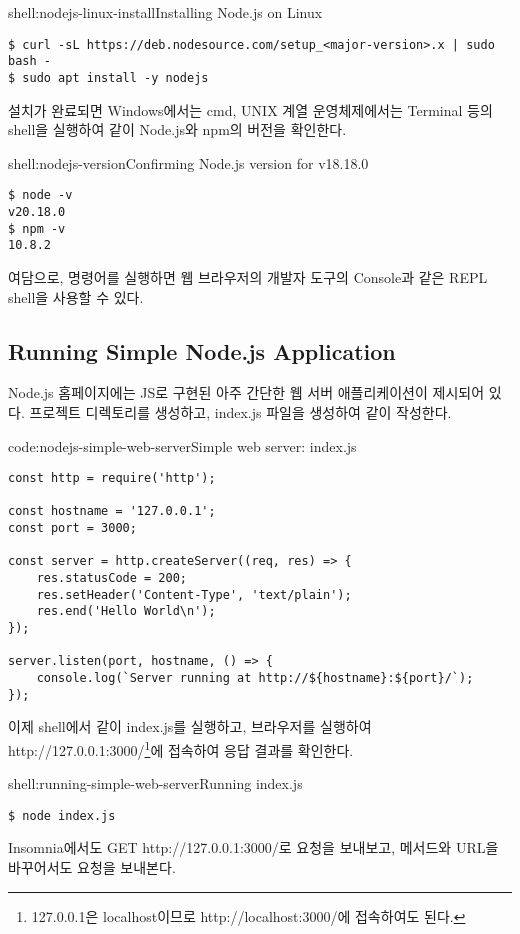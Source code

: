 
\begin{shell}{shell:nodejs-linux-install}{Installing Node.js on Linux}
\begin{verbatim}
$ curl -sL https://deb.nodesource.com/setup_<major-version>.x | sudo bash -
$ sudo apt install -y nodejs
\end{verbatim}
\end{shell}

설치가 완료되면 Windows에서는 cmd, UNIX 계열 운영체제에서는 Terminal 등의 shell을 실행하여 \과 같이 Node.js와 npm의 버전을 확인한다.
\clearpage

\begin{shell}{shell:nodejs-version}{Confirming Node.js version for v18.18.0}
\begin{verbatim}
$ node -v
v20.18.0
$ npm -v
10.8.2
\end{verbatim}
\end{shell}

여담으로,  명령어를 실행하면 웹 브라우저의 개발자 도구의 Console과 같은 REPL shell을 사용할 수 있다.

\subsection*{Running Simple Node.js Application}

Node.js 홈페이지에는 JS로 구현된 아주 간단한 웹 서버 애플리케이션이 제시되어 있다. 프로젝트 디렉토리를 생성하고, index.js 파일을 생성하여 \와 같이 작성한다.

\begin{code}{code:nodejs-simple-web-server}{Simple web server: index.js}
\begin{verbatim}
const http = require('http');

const hostname = '127.0.0.1';
const port = 3000;

const server = http.createServer((req, res) => {
    res.statusCode = 200;
    res.setHeader('Content-Type', 'text/plain');
    res.end('Hello World\n');
});

server.listen(port, hostname, () => {
    console.log(`Server running at http://${hostname}:${port}/`);
});
\end{verbatim}
\end{code}

이제 shell에서 \와 같이 index.js를 실행하고, 브라우저를 실행하여 http://127.0.0.1:3000/\footnote{127.0.0.1은 localhost이므로 http://localhost:3000/에 접속하여도 된다.}에 접속하여 응답 결과를 확인한다.

\begin{shell}{shell:running-simple-web-server}{Running index.js}
\begin{verbatim}
$ node index.js
\end{verbatim}
\end{shell}

Insomnia에서도 GET http://127.0.0.1:3000/로 요청을 보내보고, 메서드와 URL을 바꾸어서도 요청을 보내본다.
